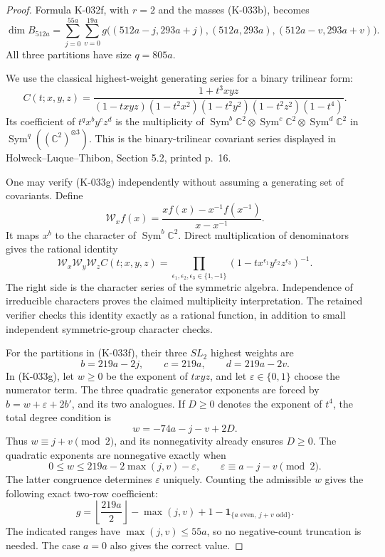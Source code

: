 \begin{proof}
Formula K-032f, with $r=2$ and the masses (K-033b), becomes
\[
 \dim B_{512a}=
 \sum_{j=0}^{55a}\sum_{v=0}^{19a}
 g\bigl((512a-j,293a+j),(512a,293a),
                       (512a-v,293a+v)\bigr).          \tag{K-033f}
\]
All three partitions have size $q=805a$.

We use the classical highest-weight generating series for a binary
trilinear form:
\[
 C(t;x,y,z)=
 \frac{1+t^3xyz}
 {(1-txyz)(1-t^2x^2)(1-t^2y^2)(1-t^2z^2)(1-t^4)}.
                                                        \tag{K-033g}
\]
Its coefficient of $t^q x^b y^c z^d$ is the multiplicity of
$\operatorname{Sym}^b\mathbb C^2\otimes
 \operatorname{Sym}^c\mathbb C^2\otimes
 \operatorname{Sym}^d\mathbb C^2$ in
$\operatorname{Sym}^q((\mathbb C^2)^{\otimes3})$.
This is the binary-trilinear covariant series displayed in
Holweck--Luque--Thibon, Section 5.2, printed p.~16.

One may verify (K-033g) independently without assuming a generating
set of covariants.  Define
\[
 \mathcal W_x f(x)=\frac{x f(x)-x^{-1}f(x^{-1})}{x-x^{-1}}.
\]
It maps $x^b$ to the character of $\operatorname{Sym}^b\mathbb C^2$.
Direct multiplication of denominators gives the rational identity
\[
 \mathcal W_x\mathcal W_y\mathcal W_z C(t;x,y,z)
   =\prod_{\epsilon_1,\epsilon_2,\epsilon_3\in\{1,-1\}}
           (1-tx^{\epsilon_1}y^{\epsilon_2}z^{\epsilon_3})^{-1}.
                                                        \tag{K-033h}
\]
The right side is the character series of the symmetric algebra.
Independence of irreducible characters proves the claimed
multiplicity interpretation.  The retained verifier checks this
identity exactly as a rational function, in addition to small
independent symmetric-group character checks.

For the partitions in (K-033f), their three $SL_2$ highest weights
are
\[
 b=219a-2j,\qquad c=219a,\qquad d=219a-2v.
\]
In (K-033g), let $w\ge0$ be the exponent of $txyz$, and let
$\varepsilon\in\{0,1\}$ choose the numerator term.  The three
quadratic generator exponents are forced by
$b=w+\varepsilon+2b'$, and its two analogues.  If $D\ge0$
denotes the exponent of $t^4$, the total degree condition is
\[
 w=-74a-j-v+2D.
\]
Thus $w\equiv j+v\pmod2$, and its nonnegativity already ensures
$D\ge0$.  The quadratic exponents are nonnegative exactly when
\[
 0\le w\le 219a-2\max(j,v)-\varepsilon,
 \qquad \varepsilon\equiv a-j-v\pmod2.
\]
The latter congruence determines $\varepsilon$ uniquely.  Counting
the admissible $w$ gives the following exact two-row coefficient:
\[
 g=\left\lfloor\frac{219a}{2}\right\rfloor-\max(j,v)+1
             -\mathbf1_{\{a\text{ even},\ j+v\text{ odd}\}}.
                                                        \tag{K-033i}
\]
The indicated ranges have $\max(j,v)\le55a$, so no negative-count
truncation is needed.  The case $a=0$ also gives the correct value.


\end{proof}
